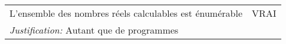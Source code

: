 \begin{longtable}{p{13cm}|l}
     L'ensemble des nombres réels calculables est énumérable & VRAI \\
     \textit{Justification:} Autant que de programmes & \\
    
\end{longtable}